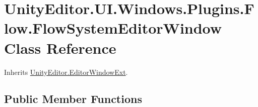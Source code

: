 \hypertarget{class_unity_editor_1_1_u_i_1_1_windows_1_1_plugins_1_1_flow_1_1_flow_system_editor_window}{}\section{Unity\+Editor.\+U\+I.\+Windows.\+Plugins.\+Flow.\+Flow\+System\+Editor\+Window Class Reference}
\label{class_unity_editor_1_1_u_i_1_1_windows_1_1_plugins_1_1_flow_1_1_flow_system_editor_window}


Inherits \hyperlink{class_unity_editor_1_1_editor_window_ext}{Unity\+Editor.\+Editor\+Window\+Ext}.

\subsection*{Public Member Functions}
